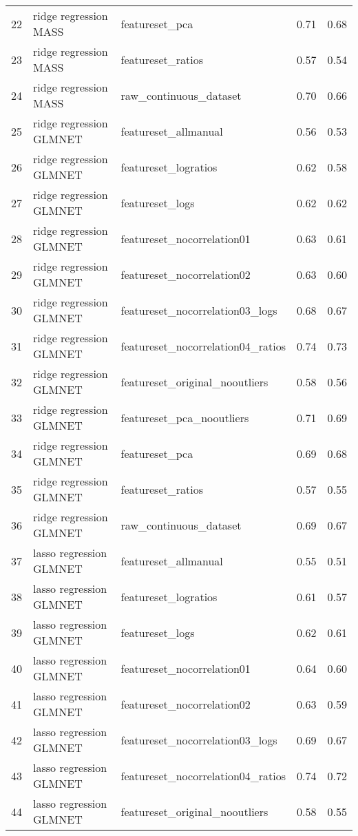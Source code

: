 \begin{tabular}{cllcc}
  22 & ridge regression MASS & featureset\_pca & 0.71 & 0.68 \\ 
  23 & ridge regression MASS & featureset\_ratios & 0.57 & 0.54 \\ 
  24 & ridge regression MASS & raw\_continuous\_dataset & 0.70 & 0.66 \\ 
  25 & ridge regression GLMNET & featureset\_allmanual & 0.56 & 0.53 \\ 
  26 & ridge regression GLMNET & featureset\_logratios & 0.62 & 0.58 \\ 
  27 & ridge regression GLMNET & featureset\_logs & 0.62 & 0.62 \\ 
  28 & ridge regression GLMNET & featureset\_nocorrelation01 & 0.63 & 0.61 \\ 
  29 & ridge regression GLMNET & featureset\_nocorrelation02 & 0.63 & 0.60 \\ 
  30 & ridge regression GLMNET & featureset\_nocorrelation03\_logs & 0.68 & 0.67 \\ 
  31 & ridge regression GLMNET & featureset\_nocorrelation04\_ratios & 0.74 & 0.73 \\ 
  32 & ridge regression GLMNET & featureset\_original\_nooutliers & 0.58 & 0.56 \\ 
  33 & ridge regression GLMNET & featureset\_pca\_nooutliers & 0.71 & 0.69 \\ 
  34 & ridge regression GLMNET & featureset\_pca & 0.69 & 0.68 \\ 
  35 & ridge regression GLMNET & featureset\_ratios & 0.57 & 0.55 \\ 
  36 & ridge regression GLMNET & raw\_continuous\_dataset & 0.69 & 0.67 \\ 
  37 & lasso regression GLMNET & featureset\_allmanual & 0.55 & 0.51 \\ 
  38 & lasso regression GLMNET & featureset\_logratios & 0.61 & 0.57 \\ 
  39 & lasso regression GLMNET & featureset\_logs & 0.62 & 0.61 \\ 
  40 & lasso regression GLMNET & featureset\_nocorrelation01 & 0.64 & 0.60 \\ 
  41 & lasso regression GLMNET & featureset\_nocorrelation02 & 0.63 & 0.59 \\ 
  42 & lasso regression GLMNET & featureset\_nocorrelation03\_logs & 0.69 & 0.67 \\ 
  43 & lasso regression GLMNET & featureset\_nocorrelation04\_ratios & 0.74 & 0.72 \\ 
  44 & lasso regression GLMNET & featureset\_original\_nooutliers & 0.58 & 0.55 \\ 

\end{tabular}
